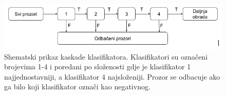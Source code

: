 \begin{figure}
	\centering
	\includegraphics[scale=0.6]{img/viola-jones-kaskada.png}
	\caption{Shematski prikaz kaskade klasifikatora. Klasifikatori su označeni brojevima 1-4 i poredani po složenosti gdje je klasifikator 1 najjednostavniji, a klasifikator 4 najsloženiji. Prozor se odbacuje ako ga bilo koji klasifikator označi kao negativnog.}
	\label{viola-jones-kaskada}
\end{figure}